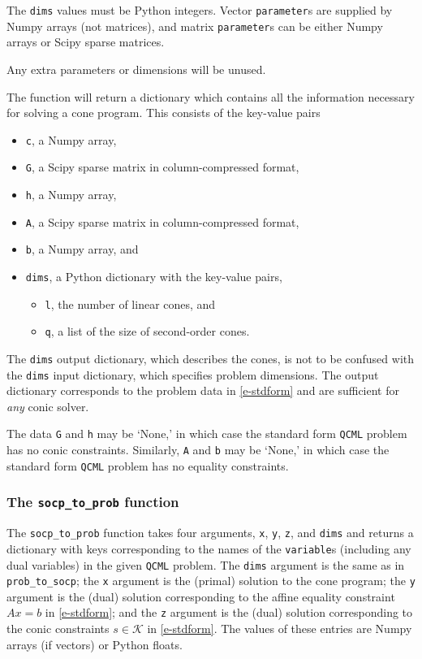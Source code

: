 \documentclass[11pt]{article}
\def\qcml{\texttt{QCML}\xspace}
\begin{document}
The {\tt dims} values must be Python integers. Vector {\tt parameter}s are
supplied by Numpy arrays (not matrices), and matrix {\tt parameter}s can be
either Numpy arrays or Scipy sparse matrices.

Any extra parameters or dimensions will be unused.

The function will return a dictionary which contains all the information
necessary for solving a cone program. This consists of the key-value pairs
\begin{itemize}
  \item {\tt c}, a Numpy array,
  \item {\tt G}, a Scipy sparse matrix in column-compressed format,
  \item {\tt h}, a Numpy array,
  \item {\tt A}, a Scipy sparse matrix in column-compressed format,
  \item {\tt b}, a Numpy array, and
  \item {\tt dims}, a Python dictionary with the key-value pairs,
  \begin{itemize}
    \item {\tt l}, the number of linear cones, and
    \item {\tt q}, a list of the size of second-order cones.
  \end{itemize}
\end{itemize}
The {\tt dims} output dictionary, which describes the cones,
is not to be confused with the {\tt dims} input
dictionary, which specifies problem dimensions.
The output dictionary corresponds to the problem data in \eqref{e-stdform}
and are sufficient for \emph{any} conic solver.

The data {\tt G} and {\tt h} may be `None,' in which case the standard form
\qcml problem has no conic constraints. Similarly, {\tt A} and {\tt b} may be
`None,' in which case the standard form \qcml problem has no equality
constraints.

\subsubsection{The {\tt socp\_to\_prob} function}
The {\tt socp\_to\_prob} function takes four arguments, {\tt x}, {\tt y},
{\tt z}, and {\tt dims} and returns a dictionary with keys
corresponding to the names of the {\tt variable}s (including any dual
variables) in the given \qcml problem.
The {\tt dims} argument is the same as in {\tt prob\_to\_socp}; the {\tt x}
argument is the (primal) solution to the cone program; the {\tt y}
argument is the (dual) solution corresponding to the
affine equality constraint $Ax=b$ in \eqref{e-stdform}; and the {\tt z}
argument is the (dual) solution corresponding
to the conic constraints $s \in \mathcal{K}$ in \eqref{e-stdform}.
The values of these entries are Numpy arrays (if vectors) or Python floats.
\end{document}
